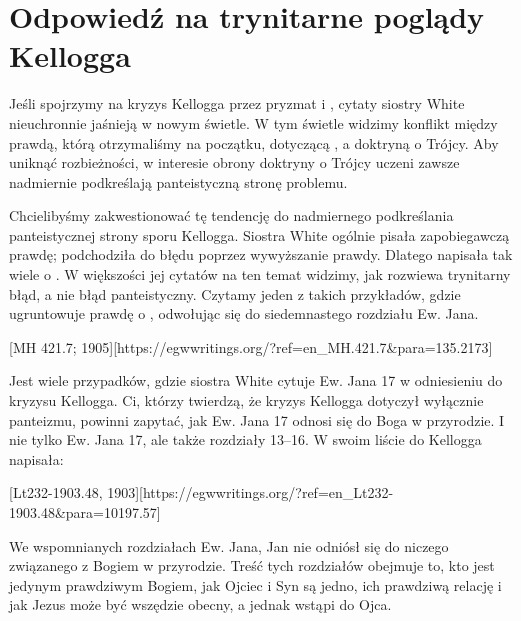 \chapter{Odpowiedź na trynitarne poglądy Kellogga}

Jeśli spojrzymy na kryzys Kellogga przez pryzmat  i , cytaty siostry White nieuchronnie jaśnieją w nowym świetle. W tym świetle widzimy konflikt między prawdą, którą otrzymaliśmy na początku, dotyczącą , a doktryną o Trójcy. Aby uniknąć rozbieżności, w interesie obrony doktryny o Trójcy uczeni zawsze nadmiernie podkreślają panteistyczną stronę problemu.

Chcielibyśmy zakwestionować tę tendencję do nadmiernego podkreślania panteistycznej strony sporu Kellogga. Siostra White ogólnie pisała zapobiegawczą prawdę; podchodziła do błędu poprzez wywyższanie prawdy. Dlatego napisała tak wiele o . W większości jej cytatów na ten temat widzimy, jak rozwiewa trynitarny błąd, a nie błąd panteistyczny. Czytamy jeden z takich przykładów, gdzie ugruntowuje prawdę o , odwołując się do siedemnastego rozdziału Ew. Jana.

[MH 421.7; 1905][https://egwwritings.org/?ref=en\_MH.421.7&para=135.2173]

Jest wiele przypadków, gdzie siostra White cytuje Ew. Jana 17 w odniesieniu do kryzysu Kellogga. Ci, którzy twierdzą, że kryzys Kellogga dotyczył wyłącznie panteizmu, powinni zapytać, jak Ew. Jana 17 odnosi się do Boga w przyrodzie. I nie tylko Ew. Jana 17, ale także rozdziały 13--16. W swoim liście do Kellogga napisała:

[Lt232-1903.48, 1903][https://egwwritings.org/?ref=en\_Lt232-1903.48&para=10197.57]

We wspomnianych rozdziałach Ew. Jana, Jan nie odniósł się do niczego związanego z Bogiem w przyrodzie. Treść tych rozdziałów obejmuje to, kto jest jedynym prawdziwym Bogiem, jak Ojciec i Syn są jedno, ich prawdziwą relację i jak Jezus może być wszędzie obecny, a jednak wstąpi do Ojca.

